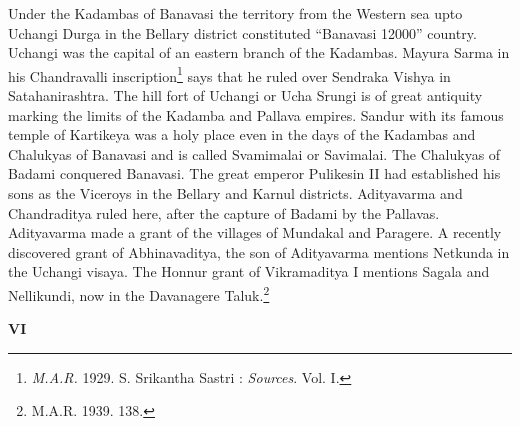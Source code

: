 \documentclass{book}
\begin{document}
Under the Kadambas of Banavasi the territory from the Western sea upto Uchangi Durga in the Bellary district constituted ``Banavasi 12000'' country. Uchangi was the capital of an eastern branch of the Kadambas. Mayura Sarma in his Chandravalli inscription\footnote[11]{{\em M.A.R.} 1929. S. Srikantha Sastri : {\em Sources}. Vol. I.} says that he ruled over Sendraka Vishya in Satahanirashtra. The hill fort of Uchangi or Ucha Srungi is of great antiquity marking the limits of the Kadamba and Pallava empires. Sandur with its famous temple of Kartikeya was a holy place even in the days of the Kadambas and Chalukyas of Banavasi and is called Svamimalai or Savimalai. The Chalukyas of Badami conquered Banavasi. The great emperor Pulikesin II had established his sons as the Viceroys in the Bellary and Karnul districts. Adityavarma and Chandraditya ruled here, after the capture of Badami by the Pallavas. Adityavarma made a grant of the villages of Mundakal and Paragere. A recently discovered grant of Abhinavaditya, the son of Adityavarma mentions Netkunda in the Uchangi visaya. The Honnur grant of Vikramaditya I mentions Sagala and Nellikundi, now in the Davanagere Taluk.\footnote[12]{{\me M.A.R.} 1939. 138.} 

\medskip
\begin{center}
{\bf VI}
\end{center}
\smallskip
\end{document}
